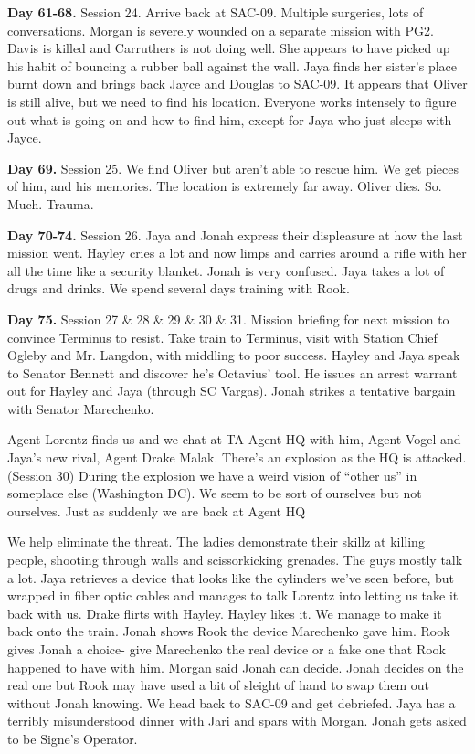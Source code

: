 \textbf{Day 61-68.} Session 24.  Arrive back at SAC-09.  Multiple surgeries, lots of conversations.  Morgan is severely wounded on a separate mission with PG2.  Davis is killed and Carruthers is not doing well.  She appears to have picked up his habit of bouncing a rubber ball against the wall.  Jaya finds her sister's place burnt down and brings back Jayce and Douglas to SAC-09. It appears that Oliver is still alive, but we need to find his location.  Everyone works intensely to figure out what is going on and how to find him, except for Jaya who just sleeps with Jayce.

\textbf{Day 69.} Session 25. We find Oliver but aren't able to rescue him.  We get pieces of him, and his memories.  The location is extremely far away.  Oliver dies. So.  Much.  Trauma.

\textbf{Day 70-74.} Session 26. Jaya and Jonah express their displeasure at how the last mission went. Hayley cries a lot and now limps and carries around a rifle with her all the time like a security blanket.  Jonah is very confused.  Jaya takes a lot of drugs and drinks.  We spend several days training with Rook. 

\textbf{Day 75.}  Session 27 \& 28 \& 29 \& 30 \& 31.  Mission briefing for next mission to convince Terminus to resist.  Take train to Terminus, visit with Station Chief Ogleby and Mr. Langdon, with middling to poor success.  Hayley and Jaya speak to Senator Bennett and discover he's Octavius' tool.  He issues an arrest warrant out for Hayley and Jaya (through SC Vargas). Jonah strikes a tentative bargain with Senator Marechenko.  

Agent Lorentz finds us and we chat at TA Agent HQ with him, Agent Vogel and Jaya's new rival, Agent Drake Malak. There's an explosion as the HQ is attacked.  (Session 30) During the explosion we have a weird vision of ``other us'' in someplace else (Washington DC).  We seem to be sort of ourselves but not ourselves.  Just as suddenly we are back at Agent HQ

We help eliminate the threat.  The ladies demonstrate their skillz at killing people, shooting through walls and scissorkicking grenades.  The guys mostly talk a lot.  Jaya retrieves a device that looks like the cylinders we've seen before, but wrapped in fiber optic cables and manages to talk Lorentz into letting us take it back with us.  Drake flirts with Hayley.  Hayley likes it.  We manage to make it back onto the train.  Jonah shows Rook the device Marechenko gave him.  Rook gives Jonah a choice- give Marechenko the real device or a fake one that Rook happened to have with him.  Morgan said Jonah can decide.  Jonah decides on the real one but Rook may have used a bit of sleight of hand to swap them out without Jonah knowing.  We head back to SAC-09 and get debriefed.  Jaya has a terribly misunderstood dinner with Jari and spars with Morgan.  Jonah gets asked to be Signe's Operator.

